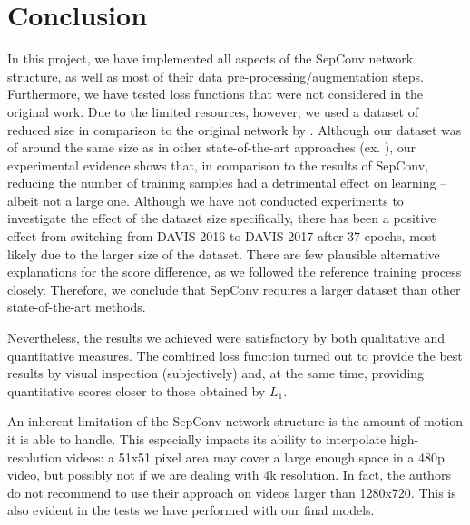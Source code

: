 \documentclass[10pt,twocolumn,letterpaper]{article}
\begin{document}

\vspace{-0.5em}
\section{Conclusion}
\label{sec:conclusion}

\vspace{-0.5em}
In this project, we have implemented all aspects of the SepConv network structure, as well as most of their data pre-processing/augmentation steps. Furthermore, we have tested loss functions that were not considered in the original work. Due to the limited resources, however, we used a dataset of reduced size in comparison to the original network by \citeauthor{SepConv}. Although our dataset was of around the same size as in other state-of-the-art approaches (ex. \cite{PhaseNet}), our experimental evidence shows that, in comparison to the results of SepConv, reducing the number of training samples had a detrimental effect on learning -- albeit not a large one. Although we have not conducted experiments to investigate the effect of the dataset size specifically, there has been a positive effect from switching from DAVIS 2016 to DAVIS 2017 after 37 epochs, most likely due to the larger size of the dataset. There are few plausible alternative explanations for the score difference, as we followed the reference training process closely. Therefore, we conclude that SepConv requires a larger dataset than other state-of-the-art methods.

Nevertheless, the results we achieved were satisfactory by both qualitative and quantitative measures. The combined loss function turned out to provide the best results by visual inspection (subjectively) and, at the same time, providing quantitative scores closer to those obtained by $L_1$. 

An inherent limitation of the SepConv network structure is the amount of motion it is able to handle. This especially impacts its ability to interpolate high-resolution videos: a 51x51 pixel area may cover a large enough space in a 480p video, but possibly not if we are dealing with 4k resolution. In fact, the authors do not recommend to use their approach on videos larger than 1280x720. This is also evident in the tests we have performed with our final models.

\end{document}
